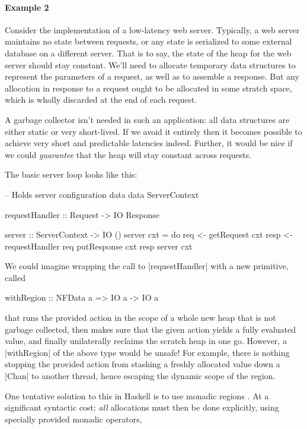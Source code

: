 \documentclass[11pt]{article}
\begin{document}
\paragraph{Example 2} Consider the implementation of a low-latency web
server. Typically, a web server maintains no state between requests,
or any state is serialized to some external database on a different
server. That is to say, the state of the heap for the web server
should stay constant. We'll need to allocate temporary data structures
to represent the parameters of a request, as well as to assemble
a response. But any allocation in response to a request ought to be
allocated in some stratch space, which is wholly discarded at the end
of each request.

A garbage collector isn't needed in such an application: all data
structures are either static or very short-lived. If we avoid it
entirely then it becomes possible to achieve very short and
predictable latencies indeed. Further, it would be nice if we could
{\em guarantee} that the heap will stay constant across requests.

The basic server loop looks like this:

\begin{code}
-- Holds server configuration data
data ServerContext

requestHandler :: Request -> IO Response
  
server :: ServerContext -> IO ()
server cxt = do
  req <- getRequest cxt
  resp <- requestHandler req
  putResponse cxt resp
  server cxt
\end{code}

We could imagine wrapping the call to |requestHandler| with a new
primitive, called

\begin{code}
withRegion :: NFData a => IO a -> IO a
\end{code}

that runs the provided action in the scope of a whole new heap that is
not garbage collected, then makes sure that the given action yields
a fully evaluated value, and finally unilaterally reclaims the scratch
heap in one go. However, a |withRegion| of the above type would be
unsafe! For example, there is nothing stopping the provided action
from stashing a freshly allocated value down a |Chan| to another
thread, hence escaping the dynamic scope of the region.

One tentative solution to this in Haskell is to use monadic regions
\cite{kiselyov_regions_2008}. At a significant syntactic cost: {\em
  all} allocations must then be done explicitly, using specially
provided monadic operators,
\end{document}
